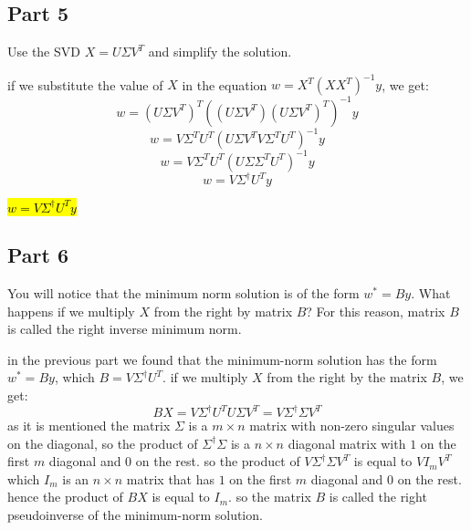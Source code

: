 \subsection{Part 5}
Use the SVD \( X = U \Sigma V^T \) and simplify the solution.
\begin{qsolve}
	\begin{qsolve}[]
		if we substitute the value of \(X\) in the equation \(w = X^T (XX^T)^{-1} y\), we get:
		$$w = (U \Sigma V^T)^T ((U \Sigma V^T) (U \Sigma V^T)^T)^{-1} y$$
		$$w = V \Sigma^T U^T (U \Sigma V^T V \Sigma^T U^T)^{-1} y$$
		$$w = V \Sigma^T U^T (U \Sigma \Sigma^T U^T)^{-1} y$$
		$$w = V \Sigma^{\dagger} U^T y$$
		\begin{center}
			\hl{$w = V \Sigma^{\dagger} U^T y$}
		\end{center}
	\end{qsolve}
\end{qsolve}
\subsection{Part 6}
You will notice that the minimum norm solution is of the form \( w^* = B y \). What happens if we multiply \( X \) from the right by matrix \( B \)? For this reason, matrix \( B \) is called the right inverse minimum norm.
\begin{qsolve}
	\begin{qsolve}[]
		in the previous part we found that the minimum-norm solution has the form \( w^* = By \), which $B = V \Sigma^{\dagger} U^T$. if we multiply \(X\) from the right by the matrix \(B\), we get:
		$$ BX = V \Sigma^{\dagger} U^T U \Sigma V^T = V \Sigma^{\dagger} \Sigma V^T$$
		as it is mentioned the matrix $\Sigma$ is a $m \times n $ matrix with non-zero singular values on the diagonal, so the product of $\Sigma^{\dagger} \Sigma$ is a $n \times n$ diagonal matrix with $1$ on the first $m$ diagonal and $0$ on the rest. so the product of $V \Sigma^{\dagger} \Sigma V^T$ is equal to $V I_m V^T$ which $I_m$ is an $n \times n$ matrix that has $1$ on the first $m$ diagonal and $0$ on the rest. hence the product of $BX$ is equal to $I_m$. so the matrix $B$ is called the right pseudoinverse of the minimum-norm solution.
	\end{qsolve}
\end{qsolve}
